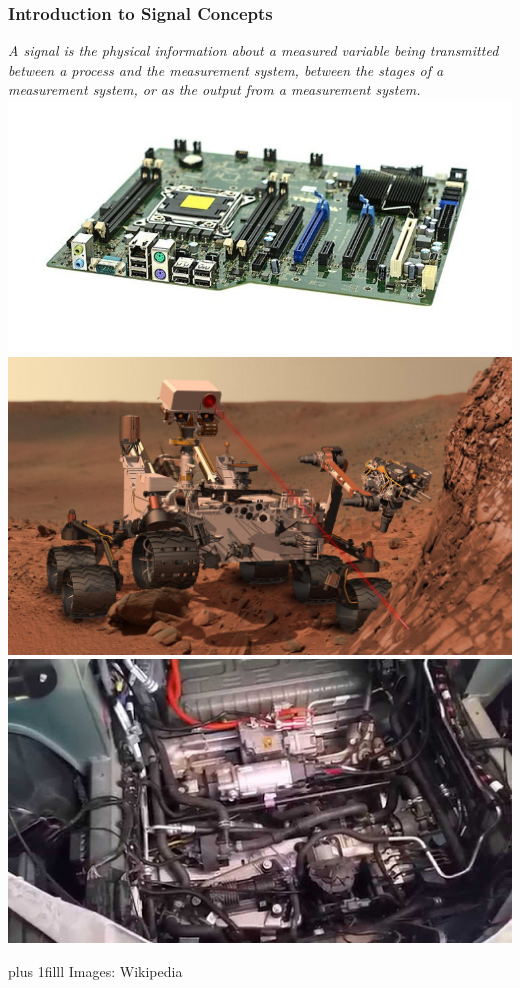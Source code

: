 \documentclass[fleqn]{beamer} %
\newcommand{\sectiontitleI}{Introduction to Signal Concepts}
\newcommand{\btVFill}{\vskip0pt plus 1filll}
\begin{document}
	\begin{frame}[label=sectionI] \small
		\frametitle{\sectiontitleI}    				
		\bigskip
		
		{\it A {\PR signal} is the physical information about a measured variable being transmitted
		between a process and the measurement system, between the stages of a measurement system, or as
		the output from a measurement system. } \\
	
		\includegraphics[scale=.07]{computer_motherboard.jpg} 
		\includegraphics[scale=.06]{curiosity_on_mars.jpg} 
		\includegraphics[scale=.22]{tesla_underhood.jpg}
		
		\btVFill
		\tiny{Images: Wikipedia}	
	\end{frame}
\end{document}
